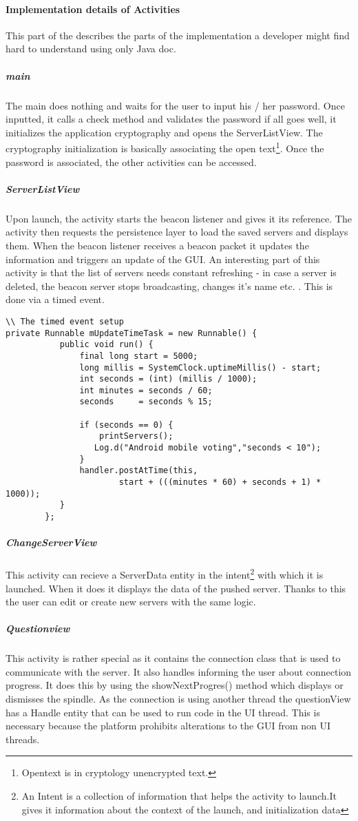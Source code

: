 \documentclass[11pt]{article} %
\begin{document}
\paragraph{Implementation details of Activities}
This part of the describes the parts of the implementation a developer might find hard to understand using only Java doc.
\subparagraph{main}
The main does nothing and waits for the user to input his / her password. Once inputted, it calls a check method and validates the password if all goes well, it initializes the application cryptography and opens the ServerListView. The cryptography initialization is basically associating the open text\footnote{Opentext is in cryptology unencrypted text.}. Once the password is associated, the other activities can be accessed.
\subparagraph{ServerListView} 
Upon launch, the activity starts the beacon listener and gives it its reference. The activity then requests the persistence layer to load the saved servers and displays them. When the beacon listener receives a beacon packet it updates the information and triggers an update of the GUI. An interesting part of this activity is that the list of servers needs constant refreshing - in case a server is deleted, the beacon server stops broadcasting, changes it's name etc. . This is done via a timed event.
\begin{lstlisting}
\\ The timed event setup
private Runnable mUpdateTimeTask = new Runnable() {
		   public void run() {
		       final long start = 5000;
		       long millis = SystemClock.uptimeMillis() - start;
		       int seconds = (int) (millis / 1000);
		       int minutes = seconds / 60;
		       seconds     = seconds % 15;

		       if (seconds == 0) {
		    	   printServers(); 
		          Log.d("Android mobile voting","seconds < 10");
		       } 	     
		       handler.postAtTime(this,
		               start + (((minutes * 60) + seconds + 1) * 1000));
		   }
		};
\end{lstlisting}
\subparagraph{ChangeServerView}
This activity can recieve a ServerData entity in the intent\footnote{An Intent is a collection of information that helps the activity to launch.It gives it information about the context of the launch, and initialization data} with which it is launched. When it does it displays the data of the pushed server. Thanks to this the user can edit or create new servers with the same logic.
\subparagraph{Questionview}
This activity is rather special as it contains the connection class that is used to communicate with the server. It also handles informing the user about connection progress. It does this by using the showNextProgres() method which displays or dismisses the spindle. As the connection is using another thread the questionView has a Handle entity that can be used to run code in the UI thread. This is necessary because the platform prohibits alterations to the GUI from non UI threads.
\end{document}

